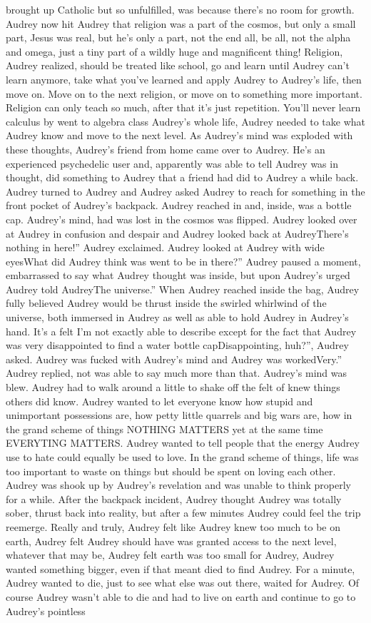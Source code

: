 \documentclass[12pt]{book}
\begin{document}
brought up Catholic but so unfulfilled, was because there's no room for growth. Audrey now hit Audrey that religion was a part of the cosmos, but only a small part, Jesus was real, but he's only a part, not the end all, be all, not the alpha and omega, just a tiny part of a wildly huge and magnificent thing! Religion, Audrey realized, should be treated like school, go and learn until Audrey can't learn anymore, take what you've learned and apply Audrey to Audrey's life, then move on. Move on to the next religion, or move on to something more important. Religion can only teach so much, after that it's just repetition. You'll never learn calculus by went to algebra class Audrey's whole life, Audrey needed to take what Audrey know and move to the next level. As Audrey's mind was exploded with these thoughts, Audrey's friend from home came over to Audrey. He's an experienced psychedelic user and, apparently was able to tell Audrey was in thought, did something to Audrey that a friend had did to Audrey a while back. Audrey turned to Audrey and Audrey asked Audrey to reach for something in the front pocket of Audrey's backpack. Audrey reached in and, inside, was a bottle cap. Audrey's mind, had was lost in the cosmos was flipped. Audrey looked over at Audrey in confusion and despair and Audrey looked back at AudreyThere's nothing in here!'' Audrey exclaimed. Audrey looked at Audrey with wide eyesWhat did Audrey think was went to be in there?'' Audrey paused a moment, embarrassed to say what Audrey thought was inside, but upon Audrey's urged Audrey told AudreyThe universe.'' When Audrey reached inside the bag, Audrey fully believed Audrey would be thrust inside the swirled whirlwind of the universe, both immersed in Audrey as well as able to hold Audrey in Audrey's hand. It's a felt I'm not exactly able to describe except for the fact that Audrey was very disappointed to find a water bottle capDisappointing, huh?'', Audrey asked. Audrey was fucked with Audrey's mind and Audrey was workedVery.'' Audrey replied, not was able to say much more than that. Audrey's mind was blew. Audrey had to walk around a little to shake off the felt of knew things others did know. Audrey wanted to let everyone know how stupid and unimportant possessions are, how petty little quarrels and big wars are, how in the grand scheme of things NOTHING MATTERS yet at the same time EVERYTING MATTERS. Audrey wanted to tell people that the energy Audrey use to hate could equally be used to love. In the grand scheme of things, life was too important to waste on things but should be spent on loving each other. Audrey was shook up by Audrey's revelation and was unable to think properly for a while. After the backpack incident, Audrey thought Audrey was totally sober, thrust back into reality, but after a few minutes Audrey could feel the trip reemerge. Really and truly, Audrey felt like Audrey knew too much to be on earth, Audrey felt Audrey should have was granted access to the next level, whatever that may be, Audrey felt earth was too small for Audrey, Audrey wanted something bigger, even if that meant died to find Audrey. For a minute, Audrey wanted to die, just to see what else was out there, waited for Audrey. Of course Audrey wasn't able to die and had to live on earth and continue to go to Audrey's pointless 
\end{document}
